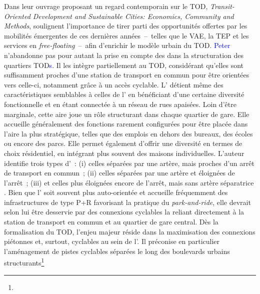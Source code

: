\begin{refsegment}
Dans leur ouvrage proposant un regard contemporain sur le \acrshort{TOD}, \foreignlanguage{english}{\textsl{Transit-Oriented Development and Sustainable Cities: Economics, Community and Methods}}, \textcolor{blue}{\textcite[222]{knowles_transit_2019}} soulignent l’importance de tirer parti des opportunités offertes par les mobilités émergentes de ces dernières années~–~telles que le \acrshort{VAE}, la \acrshort{TEP} et les services en \textsl{free-floating}~–~afin d’enrichir le modèle urbain du \acrshort{TOD}. \textcolor{blue}{Peter} \textcolor{blue}{\textcite[54-55]{calthorpe_next_1993}} n’abandonne pas pour autant la prise en compte des  dans la structuration des quartiers \acrshort{TOD}\textcolor{blue}{s}. Il les intègre partiellement au \acrshort{TOD}, considérant qu’elles sont suffisamment proches d’une station de transport en commun pour être orientées vers celle-ci, notamment grâce à un accès cyclable. L' détient même des caractéristiques semblables à celles de l’ en bénéficiant d'une certaine diversité fonctionnelle et en étant connectée à un réseau de rues apaisées. Loin d’être marginale, cette aire joue un rôle structurant dans chaque quartier de gare. Elle accueille généralement des fonctions rarement configurées pour être placée dans l’aire la plus stratégique, telles que des emplois en dehors des bureaux, des écoles ou encore des parcs. Elle permet également d’offrir une diversité en termes de choix résidentiel, en intégrant plus souvent des maisons individuelles. L'auteur identifie trois types d’~: (i) celles séparées par une artère, mais proches d’un arrêt de transport en commun~; (ii) celles séparées par une artère et éloignées de l’arrêt~; (iii) et celles plus éloignées encore de l’arrêt, mais sans artère séparatrice \textcolor{blue}{\autocite[87]{calthorpe_next_1993}}. Bien que l' soit souvent plus auto-orientée et accueille fréquemment des infrastructures de type \acrfull{P+R} favorisant la pratique du \textsl{park-and-ride}, elle devrait selon lui être desservie par des connexions cyclables la reliant directement à la station de transport en commun et au quartier de gare central. Dès la formalisation du \acrshort{TOD}, l’enjeu majeur réside dans la maximisation des connexions piétonnes et, surtout, cyclables au sein de l’. Il préconise en particulier l’aménagement de pistes cyclables séparées le long des boulevards urbains structurants\footnote{
}
\end{refsegment}
